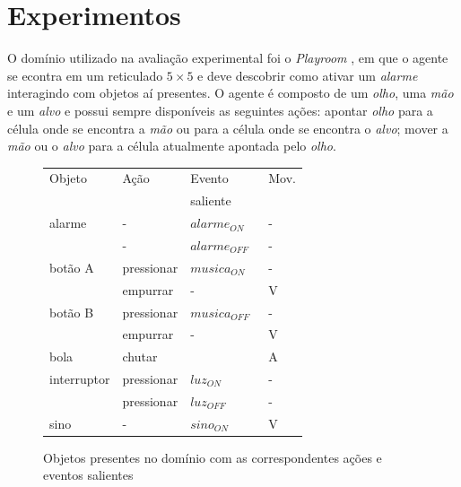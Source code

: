 \documentclass[kdmile,a4paper]{kdmile} %
\newcommand{\tmon}{$alarme_{ON}$}
\newcommand{\tmoff}{$alarme_{OFF}$}
\newcommand{\muon}{$musica_{ON}$}
\newcommand{\muoff}{$musica_{OFF}$}
\newcommand{\lion}{$luz_{ON}$}
\newcommand{\lioff}{$luz_{OFF}$}
\newcommand{\beon}{$sino_{ON}$}
\newcommand{\tr}[1]{\textcolor{MidnightBlue}{\textbf{#1}}}
\newcommand{\grifar}[1]{\dotuline{#1}}
\begin{document}










\section{Experimentos}
O domínio utilizado na avaliação experimental foi o \emph{Playroom}
\cite{imrl2004}, em que o agente se econtra em um reticulado
$5\times5$ e deve descobrir como ativar um \emph{alarme} interagindo
com objetos aí presentes.
O agente é composto de um \emph{olho}, uma \emph{mão} e um \emph{alvo}
e possui sempre disponíveis as seguintes ações: apontar \emph{olho}
para a célula onde se encontra a \emph{mão} ou para a célula onde se
encontra o \emph{alvo}; mover a \emph{mão} ou o \emph{alvo} para a
célula atualmente apontada pelo \emph{olho}.
\begin{figure}
  \small
  \begin{center}
\begin{tabular}{llll}
\hline
Objeto & Ação & Evento & Mov. \\
 &  & saliente &  \\
\hline
alarme & - & \tmon\ & - \\
 & - & \tmoff\ & - \\
botão A & pressionar & \muon\ & - \\
 & empurrar & - & V \\
botão B & pressionar & \muoff\ & - \\
 & empurrar & - & V \\
bola & chutar &  & A \\
interruptor & pressionar & \lion & - \\
 & pressionar & \lioff & - \\
sino & - & \beon\ & V \\
\hline
\end{tabular}
  \end{center}
  \tiny
  \caption{Objetos presentes no domínio com as correspondentes ações e eventos salientes}
  \label{fig:obj}
\end{figure}
\end{document}
